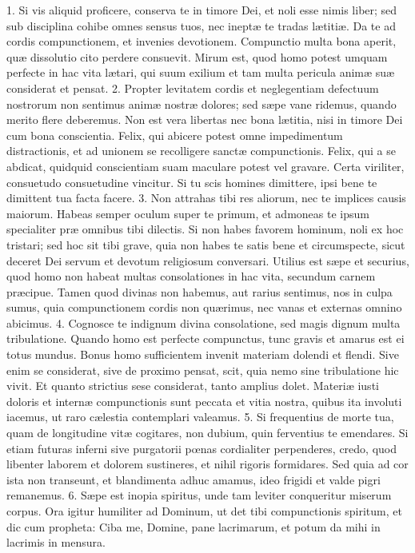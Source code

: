 \documentclass[twoside]{article}
\begin{document}
1. Si vis aliquid proficere, conserva te in timore Dei, et noli esse nimis liber; sed sub disciplina cohibe omnes sensus tuos, nec ineptæ te tradas lætitiæ. Da te ad cordis compunctionem, et invenies devotionem. Compunctio multa bona aperit, quæ dissolutio cito perdere consuevit. Mirum est, quod homo potest umquam perfecte in hac vita lætari, qui suum exilium et tam multa pericula animæ suæ considerat et pensat.
2. Propter levitatem cordis et neglegentiam defectuum nostrorum non sentimus animæ nostræ dolores; sed sæpe vane ridemus, quando merito flere deberemus. Non est vera libertas nec bona lætitia, nisi in timore Dei cum bona conscientia. Felix, qui abicere potest omne impedimentum distractionis, et ad unionem se recolligere sanctæ compunctionis. Felix, qui a se abdicat, quidquid conscientiam suam maculare potest vel gravare. Certa viriliter, consuetudo consuetudine vincitur. Si tu scis homines dimittere, ipsi bene te dimittent tua facta facere.
3. Non attrahas tibi res aliorum, nec te implices causis maiorum. Habeas semper oculum super te primum, et admoneas te ipsum specialiter præ omnibus tibi dilectis. Si non habes favorem hominum, noli ex hoc tristari; sed hoc sit tibi grave, quia non habes te satis bene et circumspecte, sicut deceret Dei servum et devotum religiosum conversari. Utilius est sæpe et securius, quod homo non habeat multas consolationes in hac vita, secundum carnem præcipue. Tamen quod divinas non habemus, aut rarius sentimus, nos in culpa sumus, quia compunctionem cordis non quærimus, nec vanas et externas omnino abicimus.
4. Cognosce te indignum divina consolatione, sed magis dignum multa tribulatione. Quando homo est perfecte compunctus, tunc gravis et amarus est ei totus mundus. Bonus homo sufficientem invenit materiam dolendi et flendi. Sive enim se considerat, sive de proximo pensat, scit, quia nemo sine tribulatione hic vivit. Et quanto strictius sese considerat, tanto amplius dolet. Materiæ iusti doloris et internæ compunctionis sunt peccata et vitia nostra, quibus ita involuti iacemus, ut raro cælestia contemplari valeamus.
5. Si frequentius de morte tua, quam de longitudine vitæ cogitares, non dubium, quin ferventius te emendares. Si etiam futuras inferni sive purgatorii pœnas cordialiter perpenderes, credo, quod libenter laborem et dolorem sustineres, et nihil rigoris formidares. Sed quia ad cor ista non transeunt, et blandimenta adhuc amamus, ideo frigidi et valde pigri remanemus.
6. Sæpe est inopia spiritus, unde tam leviter conqueritur miserum corpus. Ora igitur humiliter ad Dominum, ut det tibi compunctionis spiritum, et dic cum propheta: Ciba me, Domine, pane lacrimarum, et potum da mihi in lacrimis in mensura.
\end{document}
